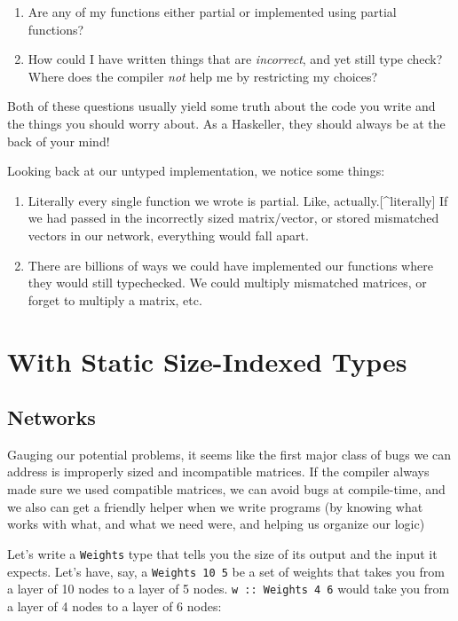 \documentclass[]{article}
\begin{document}
\begin{enumerate}
\tightlist
\item
  Are any of my functions either partial or implemented using partial functions?
\item
  How could I have written things that are \emph{incorrect}, and yet still type
  check? Where does the compiler \emph{not} help me by restricting my choices?
\end{enumerate}

Both of these questions usually yield some truth about the code you write and
the things you should worry about. As a Haskeller, they should always be at the
back of your mind!

Looking back at our untyped implementation, we notice some things:

\begin{enumerate}
\tightlist
\item
  Literally every single function we wrote is partial. Like,
  actually.{[}\^{}literally{]} If we had passed in the incorrectly sized
  matrix/vector, or stored mismatched vectors in our network, everything would
  fall apart.
\item
  There are billions of ways we could have implemented our functions where they
  would still typechecked. We could multiply mismatched matrices, or forget to
  multiply a matrix, etc.
\end{enumerate}

\section{With Static Size-Indexed Types}

\subsection{Networks}

Gauging our potential problems, it seems like the first major class of bugs we
can address is improperly sized and incompatible matrices. If the compiler
always made sure we used compatible matrices, we can avoid bugs at compile-time,
and we also can get a friendly helper when we write programs (by knowing what
works with what, and what we need were, and helping us organize our logic)

Let's write a \texttt{Weights} type that tells you the size of its output and
the input it expects. Let's have, say, a \texttt{Weights\ 10\ 5} be a set of
weights that takes you from a layer of 10 nodes to a layer of 5 nodes.
\texttt{w\ ::\ Weights\ 4\ 6} would take you from a layer of 4 nodes to a layer
of 6 nodes:
\end{document}
